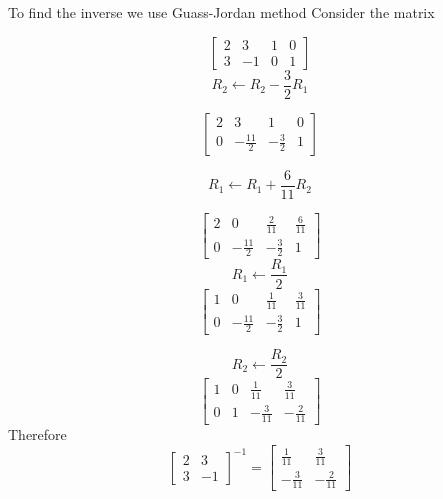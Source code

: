 \documentclass{beamer}
\begin{document}
\begin{frame}
To find the inverse we use Guass-Jordan method
\newline
\newline
Consider the matrix

\newline
\[\begin{bmatrix}
2 & 3 & 1 & 0\\
3 & -1 & 0 & 1
\end{bmatrix}\]
\newline
\newline
\[R_{2} \leftarrow R_{2} - \frac{3}{2}R_{1}\]
\newline

\[\begin{bmatrix}
2 & 3 & 1 & 0\\
0 & -\frac{11}{2} & -\frac{3}{2} & 1
\end{bmatrix}\]
\end{frame}
\begin{frame}
\[R_{1} \leftarrow R_{1} + \frac{6}{11}R_{2}\]

\[\begin{bmatrix}
2 & 0 & \frac{2}{11} & \frac{6}{11}\\
0 & -\frac{11}{2} & -\frac{3}{2} & 1
\end{bmatrix}\]
\newline 
\[R_{1} \leftarrow \frac{R_{1}}{2}\]
\[\begin{bmatrix}
1 & 0 & \frac{1}{11} & \frac{3}{11}\\
0 & -\frac{11}{2} & -\frac{3}{2} & 1
\end{bmatrix}\]

\end{frame}
\begin{frame}
\[R_{2} \leftarrow \frac{R_{2}}{2}\]
\[\begin{bmatrix}
1 & 0 & \frac{1}{11} & \frac{3}{11}\\
0 & 1 & -\frac{3}{11} & -\frac{2}{11}
\end{bmatrix}\]
\newline
Therefore
\newline
\[\begin{bmatrix}
2 & 3 \\
3 & -1
\end{bmatrix}^{-1} =\begin{bmatrix}
 \frac{1}{11} & \frac{3}{11}\\
 -\frac{3}{11} & -\frac{2}{11}
\end{bmatrix}\]





\end{frame}
\end{document}
